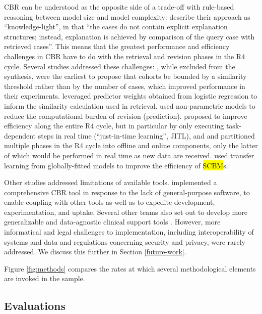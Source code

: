 \documentclass[sn-mathphys,Numbered,pdflatex]{sn-jnl}
\theoremstyle{remark}
\theoremstyle{definition}
\begin{document}
CBR can be understood as the opposite side of a trade-off with
rule-based reasoning between model size and model complexity:
\citet{Doyle2006} describe their approach as ``knowledge-light'', in
that ``the cases do not contain explicit explanation structures;
instead, explanation is achieved by comparison of the query case with
retrieved cases''. This means that the greatest performance and
efficiency challenges in CBR have to do with the retrieval and revision
phases in the R4 cycle. Several studies addressed these challenges:
\citet{Park2006}, while excluded from the synthesis, were the earliest
to propose that cohorts be bounded by a similarity threshold rather than
by the number of cases, which improved performance in their experiments.
\citet{CampilloGimenez2013} leveraged predictor weights obtained from
logistic regression to inform the similarity calculation used in
retrieval. \citet{Lowsky2013} used non-parametric models to reduce the
computational burden of revision (prediction). \citet{Ma2020} proposed
to improve efficiency along the entire R4 cycle, but in particular by
only executing task-dependent steps in real time (``just-in-time
learning'', JITL), and \citet{Ng2021} and \citet{Tang2021} partitioned
multiple phases in the R4 cycle into offline and online components, only
the latter of which would be performed in real time as new data are
received. \citet{Liu2022} used transfer learning from globally-fitted
models to improve the efficiency of \hl{SCBM}s.

Other studies addressed limitations of available tools.
\citet{Lopez2011} implemented a comprehensive CBR tool in response to
the lack of general-purpose software, to enable coupling with other
tools as well as to expedite development, experimentation, and uptake.
Several other teams also set out to develop more generalizable and
data-agnostic clinical support tools
\citep{Elter2007, Liang2015, Ng2015, Zhang2018}. However, more
informatical and legal challenges to implementation, including
interoperability of systems and data and regulations concerning security
and privacy, were rarely addressed. We discuss this further in Section
\ref{future-work}.

Figure \ref{fig:methods} compares the rates at which several
methodological elements are invoked in the sample.

\subsection{Evaluations}\label{evaluations}
\end{document}
